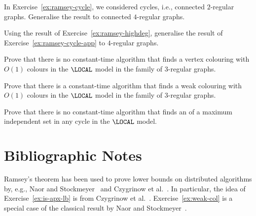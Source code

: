 \begin{ex}\label{ex:ramsey-highdeg}
    In Exercise~\ref{ex:ramsey-cycle}, we considered cycles, i.e., connected $2$-regular graphs. Generalise the result to connected $4$-regular graphs.

\end{ex}

\begin{ex}\label{ex:ramsey-highdeg-app}
    Using the result of Exercise~\ref{ex:ramsey-highdeg}, generalise the result of Exercise~\ref{ex:ramsey-cycle-app} to $4$-regular graphs.
\end{ex}

\begin{ex}\label{ex:ramsey-highdeg}
    Prove that there is no constant-time algorithm that finds a vertex colouring with $O(1)$ colours in the $\LOCAL$ model in the family of $3$-regular graphs.

\end{ex}

\begin{exs}\label{ex:weak-col}
    Prove that there is a constant-time algorithm that finds a weak colouring with $O(1)$ colours in the $\LOCAL$ model in the family of $3$-regular graphs.
\end{exs}

\begin{exs}\label{ex:is-apx-lb}
    Prove that there is no constant-time algorithm that finds an  of a maximum independent set in any cycle in the $\LOCAL$ model.
    
\end{exs}


\section{Bibliographic Notes}

Ramsey's theorem has been used to prove lower bounds on distributed algorithms by, e.g., Naor and Stockmeyer~\cite{naor95what} and Czygrinow et al.~\cite{czygrinow08fast}. In particular, the idea of Exercise~\ref{ex:is-apx-lb} is from Czygrinow et al.~\cite{czygrinow08fast}. Exercise~\ref{ex:weak-col} is a special case of the classical result by Naor and Stockmeyer~\cite{naor95what}.
